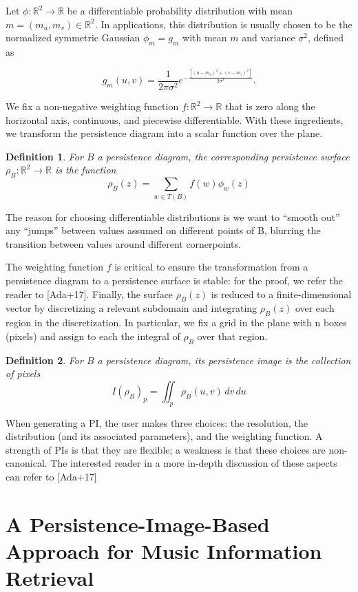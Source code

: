 \documentclass[english, LaM, oneside, noexaminfo]{sapthesis}
\newtheorem{defin}{\bf Definition}[section]
\begin{document}
Let $\phi : \mathbb{R}^2 \rightarrow \mathbb{R}$ be a differentiable probability distribution with mean $m = (m_u, m_v) \in \mathbb{R}^2$. In applications, this distribution is usually chosen to be the normalized symmetric Gaussian $\phi_m = g_m$ with mean $m$ and variance $\sigma^2$, defined as
 
$$g_m(u, v) = \frac{1}{2\pi \sigma^2}e^{-\frac{[(u- m_u)^2+(v- m_v)^2]}{2\sigma^2}}.$$

We fix a non-negative weighting function $f: \mathbb{R}^2 \rightarrow \mathbb{R}$ that is zero along the horizontal axis, continuous, and piecewise differentiable. With these ingredients, we transform the persistence diagram into a scalar function over the plane.

\begin{defin} For $B$ a persistence diagram, the corresponding \textit{persistence surface} $\rho_B : \mathbb{R}^2 \rightarrow \mathbb{R}$ is the function 
$$ \rho_B(z) = \sum_{w \in T(B)} f(w)\phi_w(z)$$ \end{defin}

The reason for choosing differentiable distributions is we want to ``smooth out'' any ``jumps'' between values assumed on different points of B, blurring the transition between values around different cornerpoints.

The weighting function $f$ is critical to ensure the transformation from a persistence diagram to a persistence surface is stable: for the proof, we refer the reader to [Ada+17].
Finally, the surface $\rho_B(z)$ is reduced to a finite-dimensional vector by discretizing a relevant
subdomain and integrating $\rho_B(z)$ over each region in the discretization. In particular,
we fix a grid in the plane with n boxes (pixels) and assign to each the integral of $\rho_B$ over
that region.

\begin{defin}For $B$ a persistence diagram, its \textit{persistence image} is the collection of pixels $$I(\rho_B)_p = \iint_p \rho_B(u,v) \,dv\,du $$\end{defin}

When generating a PI, the user makes three choices: the resolution, the distribution
(and its associated parameters), and the weighting function. A strength of PIs is that they
are flexible; a weakness is that these choices are non-canonical. The interested reader in a more in-depth discussion of these aspects can refer to [Ada+17]



\chapter{A Persistence-Image-Based Approach for Music Information Retrieval}
\end{document}

